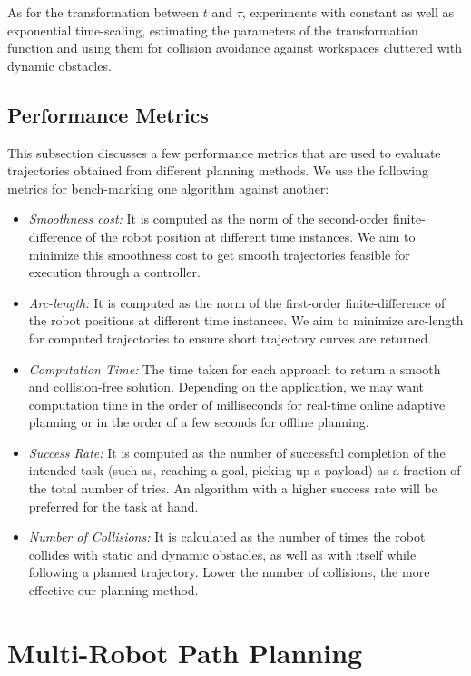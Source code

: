 As for the transformation between $t$ and $\tau$, \cite{CDC_time_scaling} experiments with constant as well as exponential time-scaling, estimating the parameters of the transformation function and using them for collision avoidance against workspaces cluttered with dynamic obstacles.

\subsection{Performance Metrics}\label{sec:traj_eval_metrics}

This subsection discusses a few performance metrics that are used to evaluate trajectories obtained from different planning methods. We use the following metrics for bench-marking one algorithm against another:

\begin{itemize}
\item \textit{Smoothness cost:} It is computed as the norm of the second-order finite-difference of the robot position at different time instances. We aim to minimize this smoothness cost to get smooth trajectories feasible for execution through a controller. 
\item \textit{Arc-length:} It is computed as the norm of the first-order finite-difference of the robot positions at different time instances. We aim to minimize arc-length for computed trajectories to ensure short trajectory curves are returned.
\item \textit{Computation Time:} The time taken for each approach to return a smooth and collision-free solution. Depending on the application, we may want computation time in the order of milliseconds for real-time online adaptive planning or in the order of a few seconds for offline planning. 
\item \textit{Success Rate:} It is computed as the number of successful completion of the intended task (such as, reaching a goal, picking up a payload) as a fraction of the total number of tries. An algorithm with a higher success rate will be preferred for the task at hand.
\item \textit{Number of Collisions:} It is calculated as the number of times the robot collides with static and dynamic obstacles, as well as with itself while following a planned trajectory. Lower the number of collisions, the more effective our planning method.
\end{itemize}

\section{Multi-Robot Path Planning}

